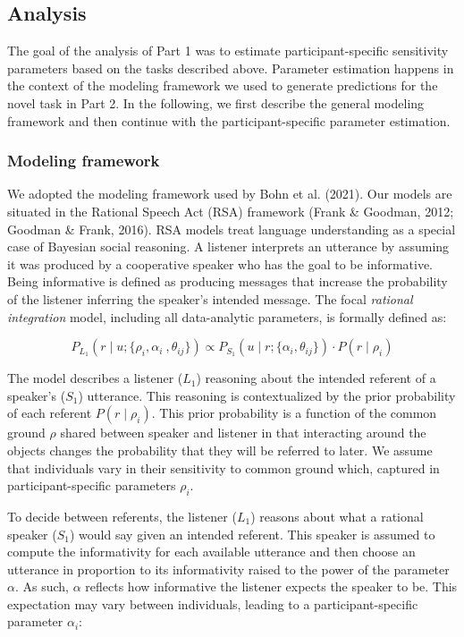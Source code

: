 \documentclass[
  man,floatsintext]{apa6}
\begin{document}
\hypertarget{analysis}{%
\subsection{Analysis}\label{analysis}}

The goal of the analysis of Part 1 was to estimate participant-specific sensitivity parameters based on the tasks described above. Parameter estimation happens in the context of the modeling framework we used to generate predictions for the novel task in Part 2. In the following, we first describe the general modeling framework and then continue with the participant-specific parameter estimation.

\hypertarget{modeling-framework}{%
\subsubsection{Modeling framework}\label{modeling-framework}}

We adopted the modeling framework used by Bohn et al. (2021). Our models are situated in the Rational Speech Act (RSA) framework (Frank \& Goodman, 2012; Goodman \& Frank, 2016). RSA models treat language understanding as a special case of Bayesian social reasoning. A listener interprets an utterance by assuming it was produced by a cooperative speaker who has the goal to be informative. Being informative is defined as producing messages that increase the probability of the listener inferring the speaker's intended message. The focal \emph{rational integration} model, including all data-analytic parameters, is formally defined as:

\begin{equation}
P_{L_1}(r \mid u; \{\rho_i, \alpha_i\ , \theta_{ij}\})\propto P_{S_1}(u \mid r; \{\alpha_i, \theta_{ij}\}) \cdot P(r \mid \rho_i)
\label{eq:rsafull1}
\end{equation}

The model describes a listener (\(L_1\)) reasoning about the intended referent of a speaker's (\(S_1\)) utterance. This reasoning is contextualized by the prior probability of each referent \(P(r \mid \rho_i)\). This prior probability is a function of the common ground \(\rho\) shared between speaker and listener in that interacting around the objects changes the probability that they will be referred to later. We assume that individuals vary in their sensitivity to common ground which, captured in participant-specific parameters \(\rho_i\).

To decide between referents, the listener (\(L_1\)) reasons about what a rational speaker (\(S_1\)) would say given an intended referent. This speaker is assumed to compute the informativity for each available utterance and then choose an utterance in proportion to its informativity raised to the power of the parameter \(\alpha\). As such, \(\alpha\) reflects how informative the listener expects the speaker to be. This expectation may vary between individuals, leading to a participant-specific parameter \(\alpha_i\):
\end{document}
